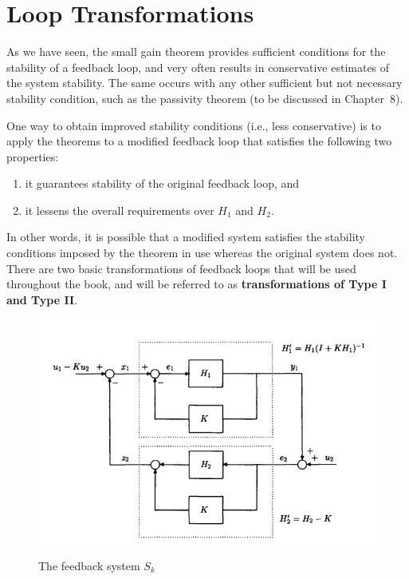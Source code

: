\section{Loop Transformations}

As we have seen, the small gain theorem provides sufficient conditions for the stability of a feedback loop, and very often results in conservative estimates of the system stability.  
The same occurs with any other sufficient but not necessary stability condition, such as the passivity theorem (to be discussed in Chapter~8).  

One way to obtain improved stability conditions (i.e., less conservative) is to apply the theorems to a modified feedback loop that satisfies the following two properties:  

\begin{enumerate}
\item  it guarantees stability of the original feedback loop, and  
\item  it lessens the overall requirements over $H_1$ and $H_2$. 
\end{enumerate}

In other words, it is possible that a modified system satisfies the stability conditions imposed by the theorem in use whereas the original system does not.  
There are two basic transformations of feedback loops that will be used throughout the book, and will be referred to as \textbf{transformations of Type I and Type II}.  

\begin{figure}[h!]
    \centering
    \includegraphics[width=\linewidth]{Images/nonlinear/ipopstability/sk.png}
    \caption{The feedback system $S_k$}
    \label{fig:feedback_sk}
\end{figure}



